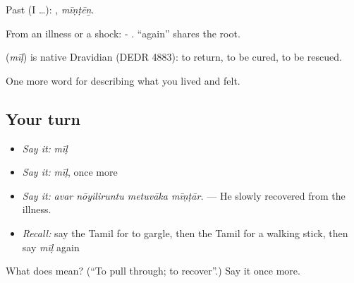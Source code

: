 Past (I …): , \emph{mīṇṭēṉ}.

From an illness or a shock: - .  \textquotedblleft{}again\textquotedblright{} shares the root.

\begin{cousinweb}
\textbf{} (\emph{mīḷ}) is native Dravidian (DEDR 4883): to return, to be cured, to be rescued.
\end{cousinweb}

\begin{grammarlens}[title={What you've built}]
One more word for describing what you lived and felt.
\end{grammarlens}

\subsection*{Your turn}
\begin{itemize}
\raggedright
  \item \emph{Say it:} \emph{mīḷ}
  \item \emph{Say it:} \emph{mīḷ}, once more
  \item \emph{Say it:} \emph{avar nōyiliruntu metuvāka mīṇṭār.} — He slowly recovered from the illness.
  \item \emph{Recall:} say the Tamil for to gargle, then the Tamil for a walking stick, then say \emph{mīḷ} again
\end{itemize}

\begin{tcolorbox}[breakable,colback=teal!4,colframe=teal!35!black,title={Before you move on}]
What does  mean? (\textquotedblleft{}To pull through; to recover\textquotedblright{}.) Say it once more.
\end{tcolorbox}
